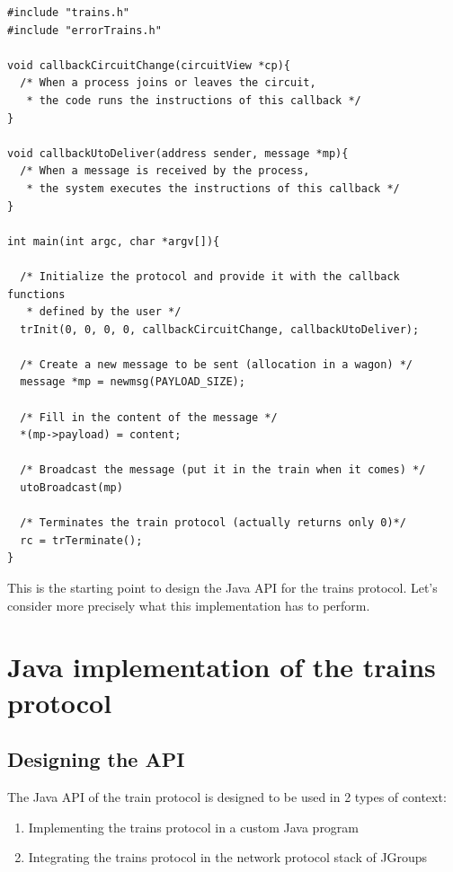 \documentclass[a4paper,10pt]{report}
\begin{document}
\lstset{language=C}
\lstset{commentstyle=\textit} 
\begin{lstlisting}
#include "trains.h"
#include "errorTrains.h"

void callbackCircuitChange(circuitView *cp){
  /* When a process joins or leaves the circuit, 
   * the code runs the instructions of this callback */
}

void callbackUtoDeliver(address sender, message *mp){
  /* When a message is received by the process,
   * the system executes the instructions of this callback */
}

int main(int argc, char *argv[]){
  
  /* Initialize the protocol and provide it with the callback functions
   * defined by the user */
  trInit(0, 0, 0, 0, callbackCircuitChange, callbackUtoDeliver);

  /* Create a new message to be sent (allocation in a wagon) */
  message *mp = newmsg(PAYLOAD_SIZE);

  /* Fill in the content of the message */
  *(mp->payload) = content;

  /* Broadcast the message (put it in the train when it comes) */
  utoBroadcast(mp)

  /* Terminates the train protocol (actually returns only 0)*/
  rc = trTerminate();
}
\end{lstlisting} 

This is the starting point to design the Java API for the trains protocol. Let's consider more precisely what this
implementation has to perform.

\chapter{Java implementation of the trains protocol}

\section{Designing the API}

The Java API of the train protocol is designed to be used in 2 types of context:
\begin{enumerate}
  \item Implementing the trains protocol in a custom Java program
  \item Integrating the trains protocol in the network protocol stack of JGroups\\
\end{enumerate}
\end{document}
